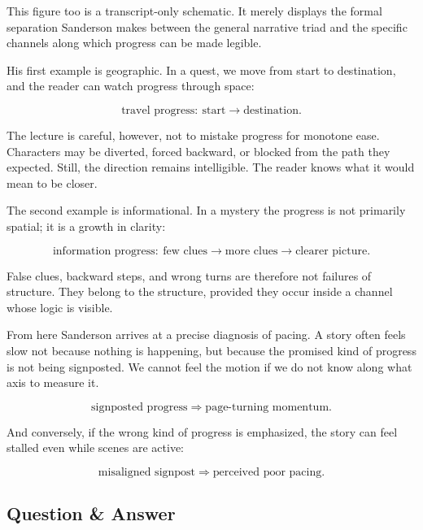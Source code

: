 This figure too is a transcript-only schematic. It merely displays the formal separation Sanderson makes between the general narrative triad and the specific channels along which progress can be made legible.

His first example is geographic. In a quest, we move from start to destination, and the reader can watch progress through space:

\begin{equation}
\text{travel progress}:\ \text{start} \to \text{destination}.
\end{equation}

The lecture is careful, however, not to mistake progress for monotone ease. Characters may be diverted, forced backward, or blocked from the path they expected. Still, the direction remains intelligible. The reader knows what it would mean to be closer.

The second example is informational. In a mystery the progress is not primarily spatial; it is a growth in clarity:

\begin{equation}
\text{information progress}:\ \text{few clues} \to \text{more clues} \to \text{clearer picture}.
\end{equation}

False clues, backward steps, and wrong turns are therefore not failures of structure. They belong to the structure, provided they occur inside a channel whose logic is visible.

From here Sanderson arrives at a precise diagnosis of pacing. A story often feels slow not because nothing is happening, but because the promised kind of progress is not being signposted. We cannot feel the motion if we do not know along what axis to measure it.

\begin{equation}
\text{signposted progress} \Rightarrow \text{page-turning momentum}.
\end{equation}

And conversely, if the wrong kind of progress is emphasized, the story can feel stalled even while scenes are active:

\begin{equation}
\text{misaligned signpost} \Rightarrow \text{perceived poor pacing}.
\end{equation}

\subsection{Question \& Answer}


